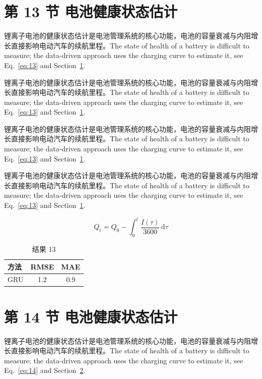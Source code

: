 \documentclass[UTF8,fontset=mac]{ctexart}
\begin{document}
\section{第 13 节 电池健康状态估计}\label{sec:13}
锂离子电池的健康状态估计是电池管理系统的核心功能，电池的容量衰减与内阻增长直接影响电动汽车的续航里程\cite{a2020}。The state of health of a battery is difficult to measure; the data-driven approach uses the charging curve to estimate it, see Eq.~\eqref{eq:13} and Section~\ref{sec:13}.

锂离子电池的健康状态估计是电池管理系统的核心功能，电池的容量衰减与内阻增长直接影响电动汽车的续航里程\cite{a2020}。The state of health of a battery is difficult to measure; the data-driven approach uses the charging curve to estimate it, see Eq.~\eqref{eq:13} and Section~\ref{sec:13}.

锂离子电池的健康状态估计是电池管理系统的核心功能，电池的容量衰减与内阻增长直接影响电动汽车的续航里程\cite{a2020}。The state of health of a battery is difficult to measure; the data-driven approach uses the charging curve to estimate it, see Eq.~\eqref{eq:13} and Section~\ref{sec:13}.

锂离子电池的健康状态估计是电池管理系统的核心功能，电池的容量衰减与内阻增长直接影响电动汽车的续航里程\cite{a2020}。The state of health of a battery is difficult to measure; the data-driven approach uses the charging curve to estimate it, see Eq.~\eqref{eq:13} and Section~\ref{sec:13}.

\begin{equation}\label{eq:13}
  Q_t = Q_0 - \int_0^t \frac{I(\tau)}{3600}\,\mathrm{d}\tau
\end{equation}
\begin{table}[h]\centering\begin{tabular}{lcc}\toprule 方法 & RMSE & MAE\\\midrule GRU & 1.2 & 0.9\\\bottomrule\end{tabular}\caption{结果 13}\end{table}

\section{第 14 节 电池健康状态估计}\label{sec:14}
锂离子电池的健康状态估计是电池管理系统的核心功能，电池的容量衰减与内阻增长直接影响电动汽车的续航里程\cite{a2020}。The state of health of a battery is difficult to measure; the data-driven approach uses the charging curve to estimate it, see Eq.~\eqref{eq:14} and Section~\ref{sec:14}.
\end{document}
